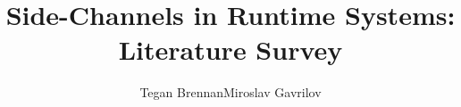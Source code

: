 \documentclass{article}
\begin{document}
     
\title{Side-Channels in Runtime Systems:\\ Literature Survey}
\author{Tegan Brennan\qquad Miroslav Gavrilov}
\maketitle




\end{document}
